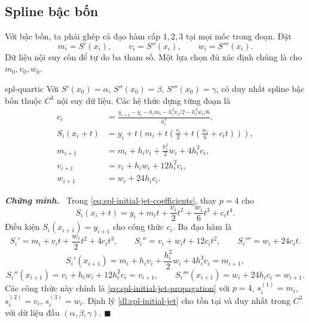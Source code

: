 \documentclass[12pt,a4paper,oneside]{book}
\numberwithin{algorithm}{chapter}
\theoremstyle{definition}
\newenvironment{chungminh}{\par\medskip\noindent\textbf{\textit{\color{mainblue}Chứng minh.}}\ }{\hfill$\blacksquare$\par\medskip}
\begin{document}
\subsection{Spline bậc bốn}
Với bậc bốn, ta phải ghép cả đạo hàm cấp $1,2,3$ tại mọi mốc trong đoạn. Đặt
\[
 m_i=S'(x_i),\qquad v_i=S''(x_i),\qquad w_i=S'''(x_i).
\]
Dữ liệu nội suy còn để tự do ba tham số. Một lựa chọn đủ xác định chúng là cho $m_0,v_0,w_0$.
\begin{menhde}{}{spl-quartic}
Với $S'(x_0)=\alpha$, $S''(x_0)=\beta$, $S'''(x_0)=\gamma$, có duy nhất spline bậc bốn thuộc $C^3$ nội suy dữ liệu. Các hệ thức dựng từng đoạn là
\begin{equation}\label{eq:spl-quartic}
 \begin{aligned}
 c_i&=\frac{y_{i+1}-y_i-h_im_i-h_i^2v_i/2-h_i^3w_i/6}{h_i^4},\\
 S_i(x_i+t)&=y_i+t\left(m_i+t\left(\frac{v_i}2+t\left(\frac{w_i}6+c_it\right)\right)\right),\\
 m_{i+1}&=m_i+h_iv_i+\frac{h_i^2}2w_i+4h_i^3c_i,\\
 v_{i+1}&=v_i+h_iw_i+12h_i^2c_i,\\
 w_{i+1}&=w_i+24h_ic_i.
 \end{aligned}
\end{equation}
\end{menhde}
\begin{chungminh}
Trong \eqref{eq:spl-initial-jet-coefficients}, thay $p=4$ cho
\[
 S_i(x_i+t)=y_i+m_it+\frac{v_i}2t^2+\frac{w_i}6t^3+c_it^4.
\]
Điều kiện $S_i(x_{i+1})=y_{i+1}$ cho công thức $c_i$. Ba đạo hàm là
\[
 S_i'=m_i+v_it+\frac{w_i}2t^2+4c_it^3,\qquad
 S_i''=v_i+w_it+12c_it^2,\qquad S_i'''=w_i+24c_it.
\]
\[
 S_i'(x_{i+1})=m_i+h_iv_i+\frac{h_i^2}2w_i+4h_i^3c_i=m_{i+1},
\]
\[
 S_i''(x_{i+1})=v_i+h_iw_i+12h_i^2c_i=v_{i+1},\qquad
 S_i'''(x_{i+1})=w_i+24h_ic_i=w_{i+1}.
\]
Các công thức này chính là \eqref{eq:spl-initial-jet-propagation} với $p=4$, $s_i^{(1)}=m_i$, $s_i^{(2)}=v_i$, $s_i^{(3)}=w_i$. Định lý \ref{dl:spl-initial-jet} cho tồn tại và duy nhất trong $C^3$ với dữ liệu đầu $(\alpha,\beta,\gamma)$.
\end{chungminh}
\end{document}
